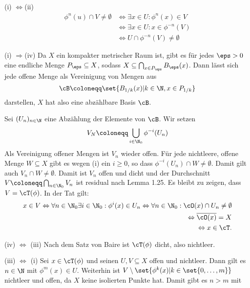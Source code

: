 \begin{beweis}
  {(i) $\Leftrightarrow$(ii)} 
  \begin{align*}
    \phi^n(u) \cap V \neq \emptyset &\Leftrightarrow \exists x \in U : \phi^n(x) \in V\\
 &\Leftrightarrow \exists x \in U : x \in \phi^{-n}(V)\\
 &\Leftrightarrow U \cap \phi^{-n}(V) \neq \emptyset
  \end{align*}

  {(i) $\Rightarrow$(iv)} Da $X$ ein kompakter metrischer Raum ist, gibt es für jedes $ \eps > 0 $ eine endliche Menge $P_\eps \subseteq X$, sodass $X \subseteq \bigcap_{x \in P_\eps} B_\eps(x)$. Dann lässt sich jede offene Menge als Vereinigung von Mengen aus
  \begin{align*}
    \cB \coloneqq \set{B_{1/k}(x)| k\in \N, x \in P_{1/k}}
  \end{align*}
darstellen, $X$ hat also eine abzählbare Basis $\cB$.

Sei $(U_n)_{n \in \N}$ eine Abzählung der Elemente von $\cB$. Wir setzen
\begin{align*}
  V_N \coloneqq \bigcup_{i \in \N_0} \phi^{-i}(U_n) 
\end{align*}
Als Vereinigung offener Mengen ist $V_n$ wieder offen. Für jede nichtleere, offene Menge $W \subseteq X$ gibt es wegen (i) ein $i \geq 0$, so dass $\phi^{-i}(U_n) \cap W \neq \emptyset$. Damit gilt auch $V_n \cap W \neq \emptyset$. Damit ist $V_n$ offen und dicht und der Durchschnitt $V \coloneqq \bigcap_{n \in \N_0} V_n$ ist residual nach Lemma 1.25. Es bleibt zu zeigen, dass $V = \cT (\phi)$.
 In der Tat gilt: 
 \begin{align*}
   x \in V \Leftrightarrow  \forall n \in \N_0 \exists i \in \N_0: \phi^i(x) \in U_n \Leftrightarrow \forall n \in \N_0: \cO(x) \cap U_n \neq \emptyset\\
\Leftrightarrow \overline{\cO(x)} = X\\
\Leftrightarrow x \in \cT. 
 \end{align*}

(iv) $\Leftrightarrow $ (iii) Nach dem Satz von Baire ist $\cT(\phi)$ dicht, also nichtleer.

(iii) $\Leftrightarrow $ (i) Sei $x \in \cT(\phi)$ und seinen $U, V \subseteq X$ offen und nichtleer. Dann gilt es $n \in \N$ mit $\phi^m(x) \in U$. Weiterhin ist $V\setminus \set{\phi^k(x)|k \in \set{0, \dots, m}}$ nichtleer und offen, da $X$ keine isolierten Punkte hat. Damit gibt es $n> m$ mit 
\end{beweis}

